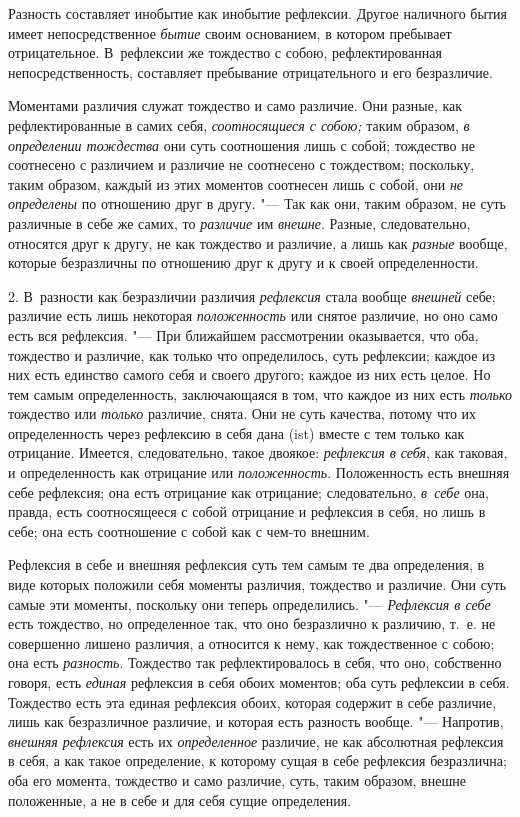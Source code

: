 Разность составляет инобытие как инобытие рефлексии. Другое наличного бытия
имеет непосредственное {\em бытие} своим основанием, в
котором пребывает отрицательное. В~рефлексии же тождество с собою,
рефлектированная непосредственность, составляет пребывание отрицательного и
его безразличие.

Моментами различия служат тождество и само различие. Они разные, как
рефлектированные в самих себя, {\em соотносящиеся с
собою;} таким образом, {\em в определении тождества}
они суть соотношения лишь с собой; тождество не соотнесено с различием и
различие не соотнесено с тождеством; поскольку, таким образом, каждый из
этих моментов соотнесен лишь с собой, они {\em не
определены} по отношению друг в другу. "--- Так как они, таким образом, не
суть различные в себе же самих, то {\em различие} им
{\em внешне}. Разные, следовательно, относятся друг к
другу, не как тождество и различие, а лишь как
{\em разные} вообще, которые безразличны по отношению
друг к другу и к своей определенности.

2. В~разности как безразличии различия {\em рефлексия}
стала вообще {\em внешней} себе; различие есть лишь
некоторая {\em положенность} или снятое различие, но
оно само есть вся рефлексия. "--- При ближайшем рассмотрении оказывается, что
оба, тождество и различие, как только что определилось, суть рефлексии;
каждое из них есть единство самого себя и своего другого; каждое из них
есть целое. Но тем самым определенность, заключающаяся в том, что каждое из
них есть {\em только} тождество или
{\em только} различие, снята. Они не суть качества,
потому что их определенность через рефлексию в себя дана (ist) вместе с тем
только как отрицание. Имеется, следовательно, такое двоякое:
{\em рефлексия в себя}, как таковая, и определенность
как отрицание или {\em положенность}. Положенность есть
внешняя себе рефлексия; она есть отрицание как отрицание; следовательно,
{\em в~себе} она, правда, есть соотносящееся с собой
отрицание и рефлексия в себя, но лишь в себе; она есть соотношение с собой
как с чем-то внешним.

Рефлексия в себе и внешняя рефлексия суть тем самым те два определения, в
виде которых положили себя моменты различия, тождество и различие. Они суть
самые эти моменты, поскольку они теперь определились. "---
{\em Рефлексия в себе} есть тождество, но определенное
так, что оно безразлично к различию, т.~е. не совершенно лишено различия, а
относится к нему, как тождественное с собою; она есть
{\em разность}. Тождество так рефлектировалось в себя,
что оно, собственно говоря, есть {\em единая} рефлексия
в себя обоих моментов; оба суть рефлексии в себя. Тождество есть эта единая
рефлексия обоих, которая содержит в себе различие, лишь как безразличное
различие, и которая есть разность вообще. "--- Напротив,
{\em внешняя рефлексия} есть их
{\em определенное} различие, не как абсолютная
рефлексия в себя, а как такое определение, к которому сущая в себе
рефлексия безразлична; оба его момента, тождество и само различие, суть,
таким образом, внешне положенные, а не в себе и для себя сущие определения.

